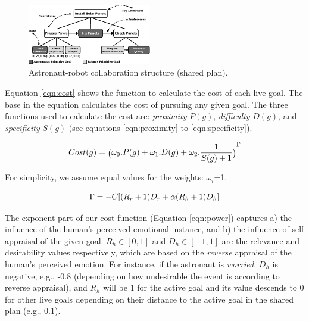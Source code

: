 \documentclass[conference]{IEEEtran}
\begin{document}
\begin{figure}[tbh]
  \centering
  \includegraphics[width=0.48\textwidth]{figure/collaborationStructure-croped.pdf}
  \vspace*{-3mm}
  \caption{{\fontsize{9}{9}\selectfont Astronaut-robot collaboration structure
  (shared plan).}}
  \label{fig:taskModel}
  \vspace*{-5mm}
\end{figure}

Equation \ref{eqn:cost} shows the function to calculate the cost of each
live goal. The base in the equation calculates the cost of pursuing any given
goal. The three functions used to calculate the cost are:
\textit{proximity} $P(g)$, \textit{difficulty} $D(g)$, and \textit{specificity}
$S(g)$ (see equations \ref{eqn:proximity} to \ref{eqn:specificity}).

\vspace*{-6mm}
\begin{equation}
{\fontsize{6}{9}\selectfont Cost(g) =
\big(\omega_0.P(g)+\omega_1.D(g)+\omega_2.\frac{1}{S(g)+1}\big)}^{\Gamma}
\label{eqn:cost}
\vspace*{-2mm}
\end{equation}

\noindent For simplicity, we assume equal values for the weights: $\omega_i$=1.

\vspace*{-3mm}
\begin{equation}
\Gamma=-C[(R_r+1)D_r + \alpha(R_h+1)D_h]
\label{eqn:power}
\vspace*{-2mm}
\end{equation}

The exponent part of our cost function (Equation \ref{eqn:power}) captures a)
the influence of the human's perceived emotional instance, and b) the influence
of self appraisal of the given goal. $R_h\in[0,1]$ and $D_h\in[-1,1]$ are the
relevance and desirability values respectively, which are based on the
\textit{reverse} appraisal of the human's perceived emotion. For instance, if
the astronaut is \textit{worried}, $D_h$ is negative, e.g., -0.8 (depending on
how undesirable the event is according to reverse appraisal), and $R_h$ will be
1 for the active goal and its value descends to 0 for other live goals depending
on their distance to the active goal in the shared plan (e.g., 0.1).
\end{document}
